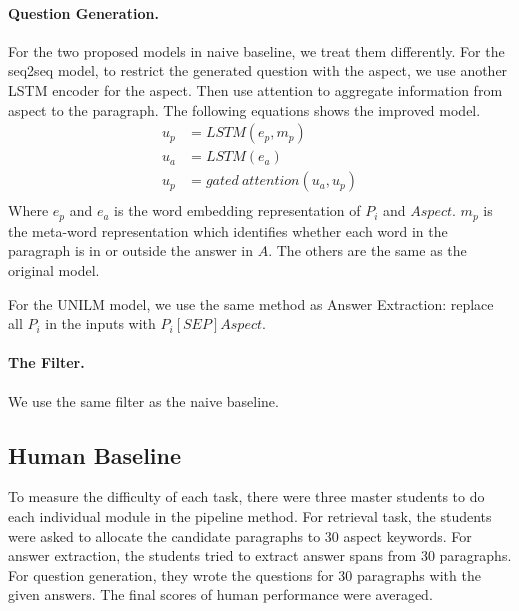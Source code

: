 \paragraph{Question Generation. } For the two proposed models in naive baseline, we treat them differently. For the seq2seq model, to restrict the generated question with the aspect, we use another LSTM encoder for the aspect. Then use attention to aggregate information from aspect to the paragraph. The following equations shows the improved model.
\begin{equation}
\begin{aligned}
u_{p} &= LSTM(e_{p}, m_{p}) \\
u_{a} &= LSTM(e_{a}) \\
u_{p} &= gated\ attention(u_{a}, u_{p})\\
\end{aligned}
\end{equation}
Where $e_p$ and $e_a$ is the word embedding representation of  $P_i$ and $Aspect$. $m_p$ is the meta-word representation which identifies whether each word in the paragraph is in or outside the answer in $A$. The others are the same as the original model.

For the UNILM model, we use the same method as Answer Extraction: replace all $P_i$ in the inputs with $P_i[SEP]Aspect$.

\paragraph{The Filter. } We use the same filter as the naive baseline.

\subsection{Human Baseline} To measure the difficulty of each task, there were three master students to do each individual module in the pipeline method.
For retrieval task, the students were asked to allocate the candidate paragraphs to 30 aspect keywords.
For answer extraction, the students tried to extract answer spans  from 30 paragraphs.
For question generation, they wrote the questions for 30 paragraphs with the given answers.
The final scores of human performance were averaged.